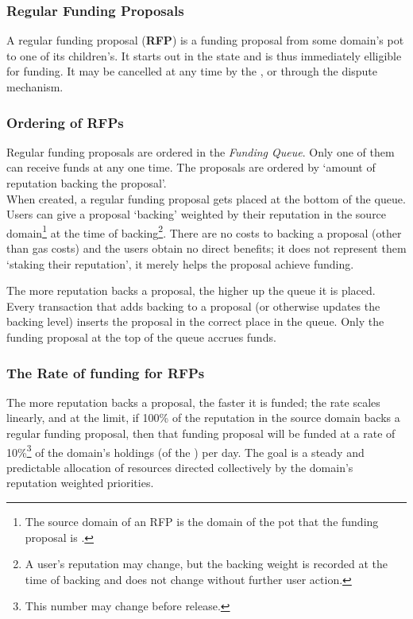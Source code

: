 







\subsubsection{Regular Funding Proposals}\label{subsubsec:RFPs}
A regular funding proposal (\textbf{RFP}) is a funding proposal from some domain's pot to one of its children's. It starts out in the  state and is thus immediately elligible for funding. It may be cancelled at any time by the , or through the dispute mechanism.

\subsubsection*{Ordering of RFPs}
Regular funding proposals are ordered in the \emph{Funding Queue}. Only one of them can receive funds at any one time. The proposals are ordered by `amount of reputation backing the proposal'.\\
When created, a regular funding proposal gets placed at the bottom of the queue. Users can give a proposal `backing' weighted by their reputation in the source domain\footnote{The source domain of an RFP is the domain of the pot that the funding proposal is .} at the time of backing\footnote{A user's reputation may change, but the backing weight is recorded at the time of backing and does not change without further user action.}. There are no costs to backing a proposal (other than gas costs) and the users obtain no direct benefits; it does not represent them `staking their reputation', it merely helps the proposal achieve funding.

The more reputation backs a proposal, the higher up the queue it is placed. Every transaction that adds backing to a proposal (or otherwise updates the backing level) inserts the proposal in the correct place in the queue. Only the funding proposal at the top of the queue accrues funds.\\

\subsubsection*{The Rate of funding for RFPs}
The more reputation backs a proposal, the faster it is funded; the rate scales linearly, and at the limit, if 100\% of the reputation in the source domain backs a regular funding proposal, then that funding proposal will be funded at a rate of 10\%\footnote{This number may change before release.} of the domain's holdings (of the ) per day.%
The goal is a steady and predictable allocation of resources directed collectively by the domain's reputation weighted priorities.

